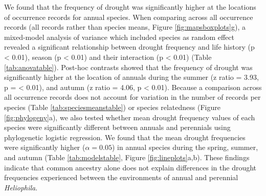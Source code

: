 \documentclass[man,floatsintext]{apa6}
\theoremstyle{definition}
\theoremstyle{definition}
\theoremstyle{definition}
\theoremstyle{remark}
\begin{document}
We found that the frequency of drought was significantly higher at the
locations of occurrence records for annual species. When comparing
across all occurrence records (all records rather than species means,
Figure \ref{fig:mapsboxplots}g), a mixed-model analysis of variance
which included species as random effect revealed a significant
relationship between drought frequency and life history (p \textless{}
0.01), season (p \textless{} 0.01) and their interaction (p \textless{}
0.01) (Table \ref{tab:anovatable}). Post-hoc contrasts showed that the
frequency of drought was significantly higher at the location of annuals
during the summer (z ratio = 3.93, p = \textless{} 0.01), and autumn (z
ratio = 4.06, p \textless{} 0.01). Because a comparison across all
occurrence records does not account for variation in the number of
records per species (Table \ref{tab:speciesmeanstable}) or species
relatedness (Figure \ref{fig:phylogeny}a), we also tested whether mean
drought frequency values of each species were significantly different
between annuals and perennials using phylogenetic logistic regression.
We found that the mean drought frequencies were significantly higher
(\(\alpha = 0.05\)) in annual species during the spring, summer, and
autumn (Table \ref{tab:modelstable}, Figure \ref{fig:lineplots}a,b).
These findings indicate that common ancestry alone does not explain
differences in the drought frequencies experienced between the
environments of annual and perennial \emph{Heliophila}.
\end{document}
